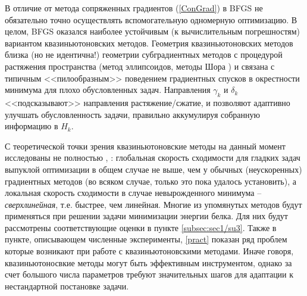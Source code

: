   В отличие от метода сопряженных градиентов (\ref{ConGrad}) в BFGS не обязательно точно осуществлять вспомогательную одномерную оптимизацию. В целом, BFGS оказался наиболее устойчивым (к вычислительным погрешностям) вариантом квазиньютоновских методов. Геометрия квазиньютоновских методов близка (но не идентична!) геометрии субградиентных методов с процедурой растяжения пространства (метод эллипсоидов, методы Шора \cite{Polyak1983}) и связана с типичным <<пилообразным>> поведением градиентных спусков в окрестности минимума для плохо обусловленных задач. Направления $\gamma _k $ и $\delta _k $ <<подсказывают>> направления растяжение/сжатие, и позволяют адаптивно улучшать обусловленность задачи, правильно аккумулируя собранную информацию в $H_k $. 

  С теоретической точки зрения квазиньютоновские методы на данный момент исследованы не полностью \cite{nesterov2013introductory}, \cite{nocedal2006sequential}: глобальная скорость сходимости для гладких задач выпуклой оптимизации в общем случае не выше, чем у обычных (неускоренных) градиентных методов (во всяком случае, только это пока удалось установить), а локальная скорость сходимости в случае невырожденного минимума -- \textit{сверхлинейная}, т.е. быстрее, чем линейная. 
  Многие из упомянутых методов будут применяться при решении задачи минимизации энергии белка. Для них будут рассмотрены соответствующие оценки в пункте \ref{subsec:sec1/su3}. Также в пункте, описывающем численные эксперименты, \ref{pract} показан ряд проблем которые возникают при работе с квазиньютоновскими методами. Иначе говоря, квазиньютоносвкие методы могут быть эффективным инструментом, однако за счет большого числа параметров требуют значительных шагов для адаптации к нестандартной постановке задачи. 

